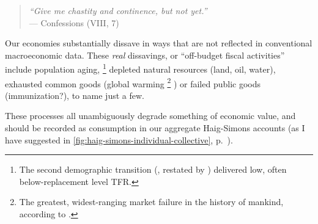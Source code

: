 \begin{quote}
	\emph{``Give me chastity and continence, but not yet.''\\}
	--- \citeauthor{St.AugusteofHippo397} Confessions (VIII, 7)
\end{quote}

Our economies substantially dissave in ways that are not reflected in conventional macroeconomic data.
These \emph{real} dissavings, or ``off-budget fiscal activities'' \cite[49]{Bonker2006} include population aging,
\footnote{
	The second demographic transition (\citealt{Davis1945}, restated by \citealt{Caldwell-1976-aa}) delivered low, often below-replacement level \gls{TFR}.
}
depleted natural resources (land, oil, water), exhausted common goods (global warming
\footnote{
	The greatest, widest-ranging market failure in the history of mankind, according to \cite{Stern-2006-aa}.
}
) or failed public goods (immunization?), to name just a few.

These processes all unambiguously degrade something of economic value, and should be recorded as consumption in our aggregate Haig-Simons accounts (as I have suggested in \autoref{fig:haig-simons-individual-collective}, p.~\pageref{fig:haig-simons-individual-collective}).

